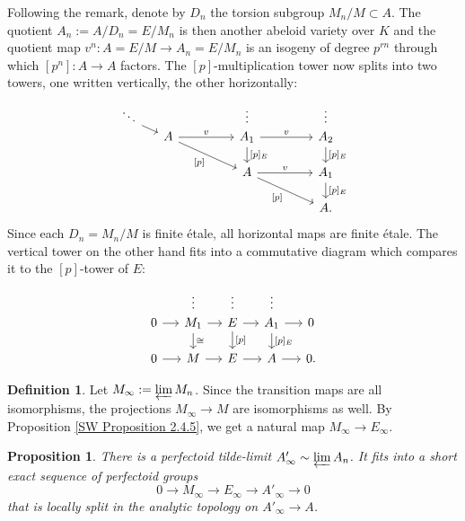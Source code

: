 \documentclass[10pt,oneside]{amsart}
\newtheorem{proposition}[theorem]{Proposition}
\theoremstyle{definition}
\newtheorem{definition}[theorem]{Definition}
\begin{document}
	Following the remark, denote by $D_n$ the torsion subgroup $M_n/M\subset A$. The quotient $A_n:=A/D_n = E/M_n$ is then another abeloid variety over $K$ and the quotient map $v^n\colon A=E/M\rightarrow A_n=E/M_n$ is an isogeny of degree $p^{rn}$  through which  $[p^n]\colon A\rightarrow A$ factors. The $[p]$-multiplication tower now splits into two towers, one written vertically, the other horizontally:
		\begin{equation}\label{p-multiplication tower of E/M splits into vertical and horizontal tower}
		\begin{tikzcd}[column sep={1.1cm,between origins},row sep={0.5cm,between origins}]
			\ddots \arrow[rd] &  &  & \vdots &  & \vdots \\
			& A \arrow[rr,"v"] \arrow[rrdd, "{[p]}"'] &  & A_1 \arrow[rr,"v"] \arrow[dd,"{[p]_E}"] &  & A_2 \arrow[dd,"{[p]_E}"] \\
			&  &  &  &  &  \\
			&  &  & A \arrow[rrdd, "{[p]}"'] \arrow[rr,"v"] &  & A_1 \arrow[dd,"{[p]_E}"] \\
			&  &  &  &  &  \\
			&  &  &  &  & A.
		\end{tikzcd}
		\end{equation}
		Since each $D_n=M_n/M$ is finite \'etale, all horizontal maps are finite \'etale. The vertical tower on the other hand fits into a commutative diagram which compares it to the $[p]$-tower of $E$:
		\begin{equation}\label{F-tower for E/M}
		\begin{tikzcd}[column sep={1.1cm,between origins},row sep={0.5cm,between origins}]
			&\vdots&\vdots&\vdots&\\
			0 \arrow[r] & M_1 \arrow[dd, "\cong"] \arrow[r] & E \arrow[dd, "{[p]}"] \arrow[r] & A_1 \arrow[dd, "{[p]_E}"] \arrow[r] & 0 \\
			\\
			0 \arrow[r] & M \arrow[r] & E \arrow[r] & A \arrow[r] & 0.
		\end{tikzcd}
		\end{equation}
		\begin{definition}
			Let $M_\infty:=\varprojlim M_n$. Since the transition maps are all isomorphisms, the projections $M_\infty\to M$ are isomorphisms as well. By Proposition \ref{SW Proposition 2.4.5}, we get a natural map $M_\infty\to E_\infty$. 
		\end{definition}
		\begin{proposition}\label{M_infty->E_infty->A'_infty}
			There is a perfectoid tilde-limit $A'_\infty\sim \varprojlim A_n$. It fits into a short exact sequence of perfectoid groups 
			\[0\to M_\infty\to E_\infty\to A'_\infty\to 0 \]
			that is  locally split in the analytic topology on $A'_\infty\to A$.
		\end{proposition}
\end{document}
